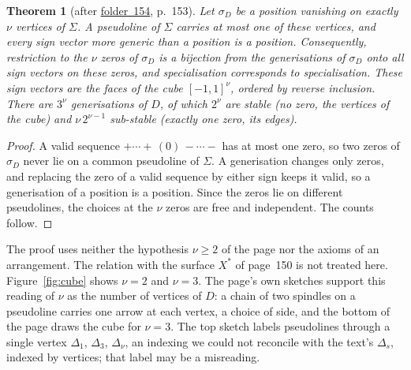 \documentclass[11pt,a4paper]{amsart}
\newtheorem{theorem}{Theorem}[section]
\theoremstyle{definition}
\theoremstyle{remark}
\newcommand{\fac}[1]{\href{https://grothendieck.umontpellier.fr/#1.pdf}{folder~#1}}
\begin{document}
\begin{theorem}[after \fac{154}, p.~153]\label{thm:cube}
Let $\sigma_D$ be a position vanishing on exactly $\nu$ vertices of $\Sigma$. A pseudoline of $\Sigma$ carries at most one of these vertices, and every sign vector more generic than a position is a position. Consequently, restriction to the $\nu$ zeros of $\sigma_D$ is a bijection from the generisations of $\sigma_D$ onto all sign vectors on these zeros, and specialisation corresponds to specialisation. These sign vectors are the faces of the cube $[-1, 1]^\nu$, ordered by reverse inclusion. There are $3^\nu$ generisations of $D$, of which $2^\nu$ are stable (no zero, the vertices of the cube) and $\nu\,2^{\nu-1}$ sub-stable (exactly one zero, its edges).
\end{theorem}

\begin{proof}
A valid sequence $+\cdots+\,(0)\,-\cdots-$ has at most one zero, so two zeros of $\sigma_D$ never lie on a common pseudoline of $\Sigma$. A generisation changes only zeros, and replacing the zero of a valid sequence by either sign keeps it valid, so a generisation of a position is a position. Since the zeros lie on different pseudolines, the choices at the $\nu$ zeros are free and independent. The counts follow.
\end{proof}

The proof uses neither the hypothesis $\nu \ge 2$ of the page nor the axioms of an arrangement. The relation with the surface $X^*$ of page~150 is not treated here. Figure~\ref{fig:cube} shows $\nu = 2$ and $\nu = 3$. The page's own sketches support this reading of $\nu$ as the number of vertices of $D$: a chain of two spindles on a pseudoline carries one arrow at each vertex, a choice of side, and the bottom of the page draws the cube for $\nu = 3$. The top sketch labels pseudolines through a single vertex $\Delta_1$, $\Delta_3$, $\Delta_\nu$, an indexing we could not reconcile with the text's $\Delta_s$, indexed by vertices; that label may be a misreading.
\end{document}
